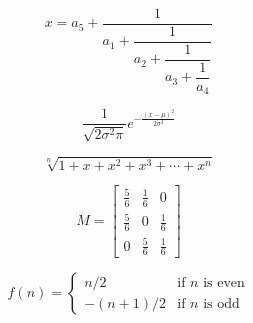 \documentclass[20pt,a4paper]{extarticle}
\begin{document}
    \begin{equation}
        {\displaystyle x = a_5+\dfrac{1}{a_1+\dfrac{1}{a_2+\dfrac{1}{a_3+\dfrac{1}{a_4}}}}}
    \end{equation}

    \begin{equation}
        {\displaystyle \dfrac{1}{\sqrt{2\sigma^2\pi}}e^{-\frac{\left(x-\mu\right)^2}{2\sigma^2}}}
    \end{equation}

    \begin{equation}
        {\displaystyle \sqrt[n]{1+x+x^2+x^3+\cdots+x^n}}
    \end{equation}
    
    \begin{equation}
        M =
        \begin{bmatrix}
            \tfrac{5}{6} & \tfrac{1}{6} & 0 \\ 
            \tfrac{5}{6} & 0 & \tfrac{1}{6} \\
            0 & \tfrac{5}{6} & \tfrac{1}{6}
        \end{bmatrix}
    \end{equation}

    \begin{equation}
        f\left(n\right) = 
        \begin{cases}
            n/2 & \text{if }n\text{ is even} \\
            -\left(n+1\right)/2 & \text{if }n\text{ is odd}
        \end{cases}
    \end{equation}
    
\end{document}
